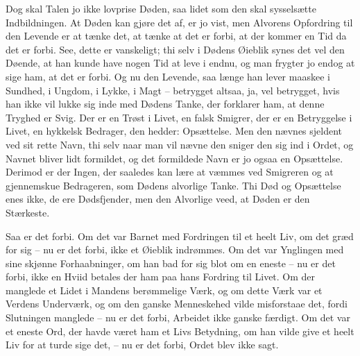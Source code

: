 \documentclass[12pt,a4paper]{article}
\begin{document}
Dog skal Talen jo ikke lovprise Døden, saa lidet som den skal sysselsætte Indbildningen. At Døden kan gjøre det af, er jo vist, men Alvorens Opfordring til den Levende er at tænke det, at tænke at det er forbi, at der kommer en Tid da det er forbi. See, dette er vanskeligt; thi selv i Dødens Øieblik synes det vel den Døende, at han kunde have nogen Tid at leve i endnu, og man frygter jo endog at sige ham, at det er forbi. Og nu den Levende, saa længe han lever maaskee i Sundhed, i Ungdom, i Lykke, i Magt – betrygget altsaa, ja, vel betrygget, hvis han ikke vil lukke sig inde med Dødens Tanke, der forklarer ham, at denne Tryghed er Svig. Der er en Trøst i Livet, en falsk Smigrer, der er en Betryggelse i Livet, en hykkelsk Bedrager, den hedder: Opsættelse. Men den nævnes sjeldent ved sit rette Navn, thi selv naar man vil nævne den sniger den sig ind i Ordet, og Navnet bliver lidt formildet, og det formildede Navn er jo ogsaa en Opsættelse. Derimod er der Ingen, der saaledes kan lære at væmmes ved Smigreren og at gjennemskue Bedrageren, som Dødens alvorlige Tanke. Thi Død og Opsættelse enes ikke, de ere Dødsfjender, men den Alvorlige veed, at Døden er den Stærkeste.

Saa er det forbi. Om det var Barnet med Fordringen til et heelt Liv, om det græd for sig – nu er det forbi, ikke et Øieblik indrømmes. Om det var Ynglingen med sine skjønne Forhaabninger, om han bad for sig blot om en eneste – nu er det forbi, ikke en Hviid betales der ham paa hans Fordring til Livet. Om der manglede et Lidet i Mandens berømmelige Værk, og om dette Værk var et Verdens Underværk, og om den ganske Menneskehed vilde misforstaae det, fordi Slutningen manglede – nu er det forbi, Arbeidet ikke ganske færdigt. Om det var et eneste Ord, der havde været ham et Livs Betydning, om han vilde give et heelt Liv for at turde sige det, – nu er det forbi, Ordet blev ikke sagt.
\end{document}
